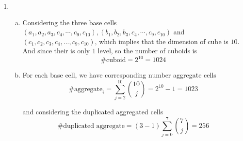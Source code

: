 \documentclass[11pt]{article}
\begin{document}
	\begin{enumerate}
		\item 
		\begin{enumerate}[a.]
		\item Considering the three base cells $(a_1, a_2, a_3, c_4, \cdots, c_9, c_{10}), (b_1, b_2, b_3, c_4, \cdots, c_9, c_{10})$ and $(c_1, c_2, c_3, c_4, ..., c_9, c_{10})$, which implies that the dimension of cube is $10$. And since their is only $1$ level, so the number of cuboids is \[\# \text{cuboid} = 2^{10} = 1024\]
		\item For each base cell, we have corresponding number aggregate cells
			\[\# \text{aggregate}_i = \sum_{j = 2}^{10} \binom{10}{j} = 2^{10} - 1 = 1023\]
			
			and considering the duplicated aggregated cells
			\[\# \text{duplicated aggregate} = (3 - 1)\sum_{j = 0}^{7} \binom{7}{j} = 256\]
			

\end{enumerate}
\end{enumerate}
\end{document}
